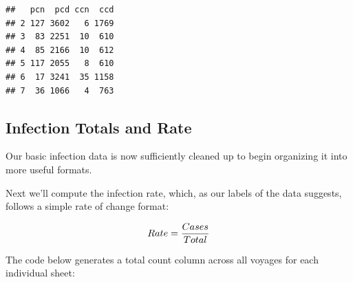 \documentclass[
  11,
]{book}
\newenvironment{Shaded}{\begin{snugshade}}{\end{snugshade}}
\newcommand{\FloatTok}[1]{\textcolor[rgb]{0.06,0.06,0.06}{#1}}
\newcommand{\FunctionTok}[1]{\textcolor[rgb]{0.27,0.27,0.27}{\textbf{#1}}}
\newcommand{\NormalTok}[1]{#1}
\newcommand{\OtherTok}[1]{\textcolor[rgb]{0.37,0.37,0.37}{#1}}
\newcommand{\SpecialCharTok}[1]{\textcolor[rgb]{0.43,0.43,0.43}{\textbf{#1}}}
\newcommand{\StringTok}[1]{\textcolor[rgb]{0.5,0.5,0.5}{#1}}
\begin{document}
\begin{Shaded}
\end{Shaded}

\begin{verbatim}
##   pcn  pcd ccn  ccd
## 2 127 3602   6 1769
## 3  83 2251  10  610
## 4  85 2166  10  612
## 5 117 2055   8  610
## 6  17 3241  35 1158
## 7  36 1066   4  763
\end{verbatim}

\hypertarget{infection-totals-and-rate}{%
\subsection*{Infection Totals and Rate}\label{infection-totals-and-rate}}


Our basic infection data is now sufficiently cleaned up to begin organizing it into more useful formats.

Next we'll compute the infection rate, which, as our labels of the data suggests, follows a simple rate of change format:

\vspace{10mm}

\begin{equation}
Rate = {Cases \over Total}
\end{equation}

\vspace{10mm}

The code below generates a total count column across all voyages for each individual sheet:
\end{document}

